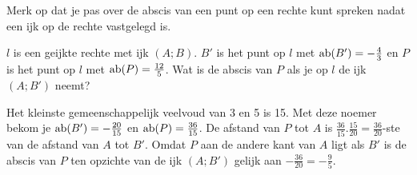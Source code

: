 

Merk op dat je pas over de abscis van een punt op een rechte kunt spreken nadat een ijk op de rechte vastgelegd is.\vspace{2mm}

\begin{voorbeeld}
	
$l$ is een geijkte rechte met ijk $(A;B)$.
$B'$ is het punt op $l$ met $\operatorname{ab} (B')=-\frac{4}{3}$ en $P$ is het punt op $l$ met $\operatorname{ab} (P)=\frac{12}{5}$.
Wat is de abscis van $P$ als je op $l$ de ijk $(A;B')$ neemt?

\begin{center}
		
\end{center}



Het kleinste gemeenschappelijk veelvoud van 3 en 5 is 15.
Met deze noemer bekom je $\operatorname{ab} (B')=-\frac{20}{15}$ en $\operatorname{ab} (P)=\frac{36}{15}$.
De afstand van $P$ tot $A$ is $\frac{36}{15}.\frac{15}{20}=\frac{36}{20}$-ste van de afstand van $A$ tot $B'$.
Omdat $P$ aan de andere kant van $A$ ligt als $B'$ is de abscis van $P$ ten opzichte van de ijk $(A;B')$ gelijk aan $-\frac{36}{20}=-\frac{9}{5}$.

\begin{center}
	
\end{center}

\end{voorbeeld}

